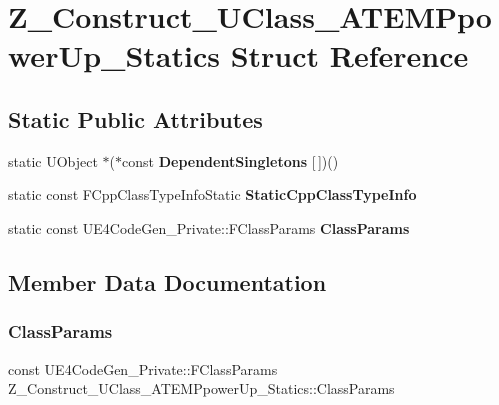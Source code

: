 \hypertarget{struct_z___construct___u_class___a_t_e_m_ppower_up___statics}{}\section{Z\+\_\+\+Construct\+\_\+\+U\+Class\+\_\+\+A\+T\+E\+M\+Ppower\+Up\+\_\+\+Statics Struct Reference}
\label{struct_z___construct___u_class___a_t_e_m_ppower_up___statics}
\subsection*{Static Public Attributes}
\begin{DoxyCompactItemize}
\item 
\mbox{\label{struct_z___construct___u_class___a_t_e_m_ppower_up___statics_a82256f913160cc5de592ee4b4d84f2ec}} 
static U\+Object $\ast$($\ast$const {\bfseries Dependent\+Singletons} \mbox{[}$\,$\mbox{]})()
\item 
static const F\+Cpp\+Class\+Type\+Info\+Static {\bfseries Static\+Cpp\+Class\+Type\+Info}
\item 
static const U\+E4\+Code\+Gen\+\_\+\+Private\+::\+F\+Class\+Params {\bfseries Class\+Params}
\end{DoxyCompactItemize}


\subsection{Member Data Documentation}
\mbox{\label{struct_z___construct___u_class___a_t_e_m_ppower_up___statics_ac42db313b1469568e070d0fde98a1c10}} 
\subsubsection{\texorpdfstring{ClassParams}{ClassParams}}
{\footnotesize\ttfamily const U\+E4\+Code\+Gen\+\_\+\+Private\+::\+F\+Class\+Params Z\+\_\+\+Construct\+\_\+\+U\+Class\+\_\+\+A\+T\+E\+M\+Ppower\+Up\+\_\+\+Statics\+::\+Class\+Params\hspace{0.3cm}{\ttfamily [static]}}

